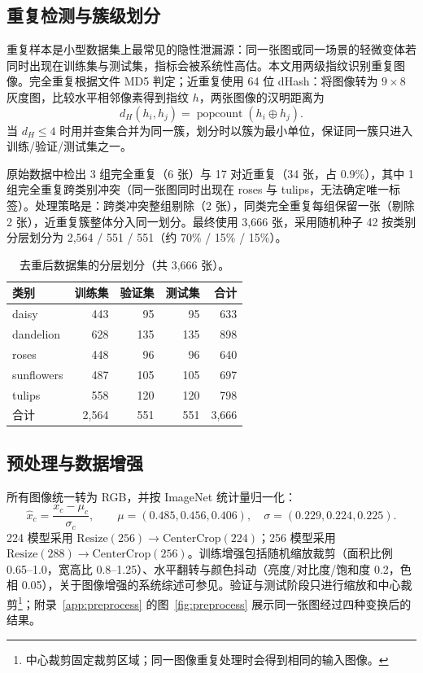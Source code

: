 \documentclass[11pt,a4paper,UTF8,fontset=windows]{ctexart}
\begin{document}
\subsection{重复检测与簇级划分}

重复样本是小型数据集上最常见的隐性泄漏源：同一张图或同一场景的轻微变体若同时出现在训练集与测试集，指标会被系统性高估。本文用两级指纹识别重复图像。完全重复根据文件 MD5 判定；近重复使用 64 位 dHash：将图像转为 $9\times8$ 灰度图，比较水平相邻像素得到指纹 $h$，两张图像的汉明距离为
\begin{equation}
d_H(h_i,h_j)=\operatorname{popcount}(h_i\oplus h_j).
\label{eq:dhash}
\end{equation}
当 $d_H\le 4$ 时用并查集合并为同一簇，划分时以簇为最小单位，保证同一簇只进入训练/验证/测试集之一。

原始数据中检出 3 组完全重复（6 张）与 17 对近重复（34 张，占 0.9\%），其中 1 组完全重复跨类别冲突（同一张图同时出现在 roses 与 tulips，无法确定唯一标签）。处理策略是：跨类冲突整组剔除（2 张），同类完全重复每组保留一张（剔除 2 张），近重复簇整体分入同一划分。最终使用 3{,}666 张，采用随机种子 42 按类别分层划分为 2{,}564 / 551 / 551（约 70\% / 15\% / 15\%）。

\begin{table}[htbp]
\centering
\small
\caption{去重后数据集的分层划分（共 3{,}666 张）。}
\label{tab:splits}
\begin{tabular}{lrrrr}
\toprule
类别 & 训练集 & 验证集 & 测试集 & 合计 \\
\midrule
daisy      & 443 & 95  & 95  & 633 \\
dandelion  & 628 & 135 & 135 & 898 \\
roses      & 448 & 96  & 96  & 640 \\
sunflowers & 487 & 105 & 105 & 697 \\
tulips     & 558 & 120 & 120 & 798 \\
\midrule
合计       & 2{,}564 & 551 & 551 & 3{,}666 \\
\bottomrule
\end{tabular}
\end{table}

\subsection{预处理与数据增强}

所有图像统一转为 RGB，并按 ImageNet 统计量归一化：
\begin{equation}
\hat{x}_{c}=\frac{x_{c}-\mu_{c}}{\sigma_{c}},\qquad
\mu=(0.485,0.456,0.406),\quad
\sigma=(0.229,0.224,0.225).
\label{eq:normalize}
\end{equation}
224 模型采用 $\text{Resize}(256)\rightarrow\text{CenterCrop}(224)$；256 模型采用 $\text{Resize}(288)\rightarrow\text{CenterCrop}(256)$。训练增强包括随机缩放裁剪（面积比例 0.65--1.0，宽高比 0.8--1.25）、水平翻转与颜色抖动（亮度/对比度/饱和度 0.2，色相 0.05），关于图像增强的系统综述可参见\cite{shorten2019augmentation}。验证与测试阶段只进行缩放和中心裁剪\footnote{中心裁剪固定裁剪区域；同一图像重复处理时会得到相同的输入图像。}；附录~\ref{app:preprocess} 的图~\ref{fig:preprocess} 展示同一张图经过四种变换后的结果。
\end{document}
